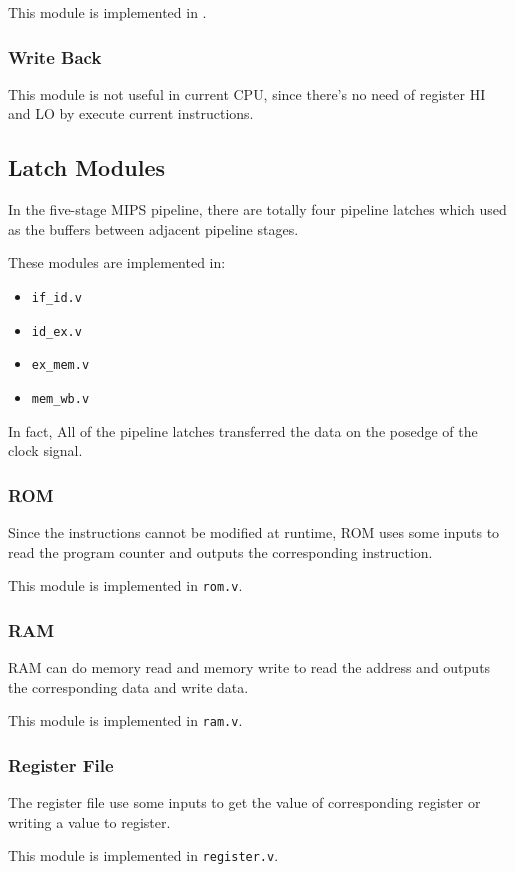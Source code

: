 \documentclass{article}
\begin{document}
This module is implemented in .

\subsubsection{Write Back}
This module is not useful in current CPU, since there's no need of register HI and LO by execute current instructions.

\newpage
\subsection{Latch Modules}
In the five-stage MIPS pipeline, there are totally four pipeline latches which used as the buffers between adjacent pipeline stages.

These modules are implemented in:
\begin{itemize}
\item
\texttt{if\_id.v}
\item
\texttt{id\_ex.v}
\item
\texttt{ex\_mem.v}
\item
\texttt{mem\_wb.v}
\end{itemize}
In fact, All of the pipeline latches transferred the data on the posedge of the clock signal.

\subsubsection{ROM}
Since the instructions cannot be modified at runtime, ROM uses some inputs to read the program counter and outputs the corresponding instruction.

This module is implemented in \texttt{rom.v}.

\subsubsection{RAM}
RAM can do memory read and memory write to read the address and outputs the corresponding data and write data.

This module is implemented in \texttt{ram.v}.

\subsubsection{Register File}
The register file use some inputs to get the value of corresponding register or writing a value to register.

This module is implemented in \texttt{register.v}.
\end{document}
